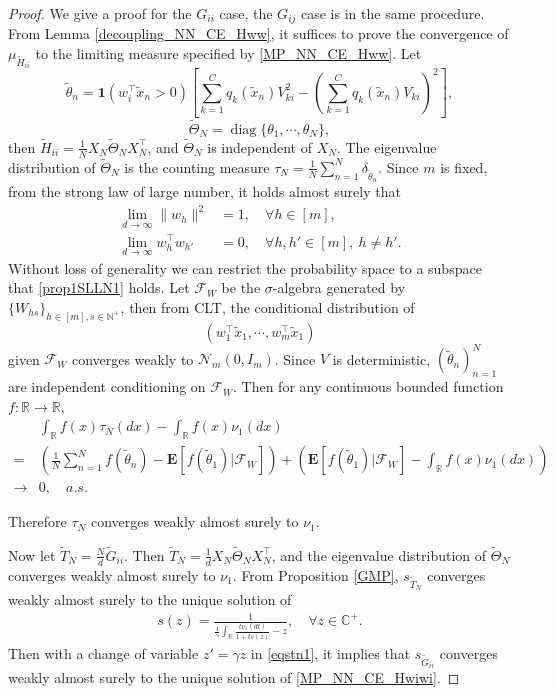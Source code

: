 \documentclass{article}
\newcommand{\diag}{\operatorname{diag}}
\newcommand{\R}{\mathbb{R}}
\newcommand{\N}{\mathbb{N}}
\newcommand{\E}{\mathbf{E}}
\newcommand{\mb}{\mathbb}
\newcommand\mf{\mathbf}
\newcommand\ml{\mathcal}
\newcommand{\wt}{\widetilde}
\newcommand{\rw}{\rightarrow}
\newcommand{\1}{^{(1)}}
\newcommand{\2}{^{(2)}}
\renewcommand{\l}{\left}
\renewcommand{\r}{\right}
\newcommand{\bea}{\begin{equation}\begin{aligned}}
\newcommand{\eea}{\end{aligned}\end{equation}}
\begin{document}
\begin{proof}
     We give a proof for the $G_{ii}$ case, the $G_{ij}$ case is in the same procedure. From Lemma \ref{decoupling_NN_CE_Hww}, it suffices to prove the convergence of  $\mu_{\wt{H}_{ii}}$ to the limiting measure specified by \eqref{MP_NN_CE_Hww}. Let 
$$
\wt{\theta}_n=\mf{1}(w_i^\top \wt{x}_n>0)\l[\sum_{k=1}^C q_k(\wt{x}_n)V_{ki}^2-\l(\sum_{k=1}^Cq_k(\wt{x}_n)V_{ki}\r)^2\r],
$$
$$
\wt{\Theta}_N=\diag\{\theta_1,\cdots,\theta_N\},
$$
then $\wt{H}_{ii}=\frac{1}{N}X_N\wt{\Theta}_NX_N^\top$, and $\wt{\Theta}_N$ is independent of $X_N$. The eigenvalue distribution of $\wt{\Theta}_N$ is the counting measure
$\tau_N=\frac{1}{N}\sum_{n=1}^N\delta_{\wt{\theta}_n}$. Since $m$ is fixed, from the strong law of large number, it holds almost surely that
\bea\label{prop1SLLN1}
\lim_{d\rw\infty}\|w_h\|^2&=1,\quad\forall h\in[m],\\
\lim_{d\rw\infty}w_h^\top w_{h'}&=0,\quad\forall h,h'\in[m],\ h\ne h'.
\eea
Without loss of generality we can restrict the probability space to a subspace that \eqref{prop1SLLN1} holds. Let $\mathcal{F}_W$ be the $\sigma$-algebra generated by $\{W_{hs}\}_{h\in [m],s\in\N^+}$, then from CLT, the conditional distribution of 
$$
(w_1^\top \wt{x}_1,\cdots,w_m^\top\wt{x}_1)
$$
given $\mathcal{F}_W$ converges weakly to $\mathcal{N}_m(0,I_m)$.
Since $V$ is deterministic, $(\wt{\theta}_n)_{n=1}^N$ are independent conditioning on $\ml{F}_W$.
Then for any continuous bounded function $f:\R\rw\R$,
\bea
&\int_{\R}f(x)\tau_N(dx)-\int_\R f(x)\nu_1(dx)\\
=&\l(\frac{1}{N}\sum_{n=1}^N f(\wt{\theta}_n)-\E\l[f(\wt{\theta}_1)|\ml{F}_W\r]\r)+\l(\E\l[f(\wt{\theta}_1)|\ml{F}_W\r]-\int_\R f(x)\nu_1(dx)\r)\\
\rw&0,\quad a.s.
\eea

Therefore $\tau_N$ converges weakly almost surely to $\nu_1$.

Now let $\wt{T}_N=\frac{N}{d}\wt{G}_{ii}$. Then $\wt{T}_N=\frac{1}{d}X_N\wt{\Theta}_NX_N^\top$, and the eigenvalue distribution of $\wt{\Theta}_N$ converges weakly almost surely to $\nu_1$. From Proposition \ref{GMP}, $s_{\wt{T}_N}$ converges weakly almost surely to the unique solution of 
\bea\label{eqstn1}
s(z)=\frac{1}{\frac{1}{\gamma}\int_{\mb{R}}\frac{t\nu_1(dt)}{1+ts(z)}-z},\quad \forall z\in \mb{C}^+.
\eea
Then with a change of variable $z'=\gamma z$ in \eqref{eqstn1}, it implies that $s_{\wt{G}_{ii}}$ converges weakly almost surely to the unique solution of \eqref{MP_NN_CE_Hwiwi}.
\end{proof}
\end{document}
